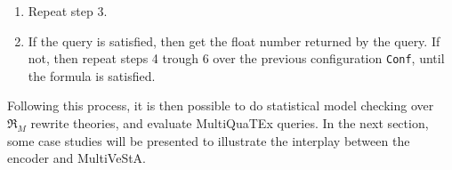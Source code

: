 \begin{enumerate}
\begin{enumerate}
\begin{maude}
{gt' | nilSL }             $\xrightarrow{chooseEvt}$      scheduleEvent({gt' | nilSL } 
{$\mathfrak{C} \ \mathfrak{M}_{j} \ \mathfrak{E}$ randomCounter(n)}              {$\mathfrak{C} \ \mathfrak{M}_{j} \ \mathfrak{E'}$ randomCounter(n+1)})\end{maude}
where $\mathfrak{E'} = \texttt{<events:Events|state:(ev(ruleQid,execute))}$.

        \item Maude reduces the terms:
        \begin{maude}
        
scheduleEvent({gt' | nilSL }  $\rightarrow$   {gt' | [gt' + 1.0 , $MG$]}   
{$\mathfrak{C} \ \mathfrak{M}_{j} \ \mathfrak{E'}$ randomCounter(n+1)})      {$\mathfrak{C} \ \mathfrak{M}_{j} \ \mathfrak{E'}$ randomCounter(n+1)})\end{maude}
    \end{enumerate}

    \item Repeat step 3.
    
    \item If the query is satisfied, then get the float number returned by the query. If not, then repeat steps 4 trough 6 over the previous configuration \texttt{Conf}, until the formula is satisfied.
\end{enumerate}
Following this process, it is then possible to do statistical model checking over $\mathfrak{R}_{M} $ rewrite theories, and evaluate MultiQuaTEx queries. In the next section, some case studies will be presented to illustrate the interplay between the encoder and MultiVeStA.
















